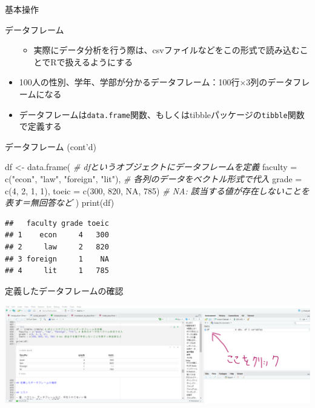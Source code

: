 \documentclass[
  ignorenonframetext,
]{beamer}
\newenvironment{Shaded}{\begin{snugshade}}{\end{snugshade}}
\newcommand{\AttributeTok}[1]{\textcolor[rgb]{0.77,0.63,0.00}{#1}}
\newcommand{\CommentTok}[1]{\textcolor[rgb]{0.56,0.35,0.01}{\textit{#1}}}
\newcommand{\ConstantTok}[1]{\textcolor[rgb]{0.00,0.00,0.00}{#1}}
\newcommand{\DecValTok}[1]{\textcolor[rgb]{0.00,0.00,0.81}{#1}}
\newcommand{\FunctionTok}[1]{\textcolor[rgb]{0.00,0.00,0.00}{#1}}
\newcommand{\NormalTok}[1]{#1}
\newcommand{\OtherTok}[1]{\textcolor[rgb]{0.56,0.35,0.01}{#1}}
\newcommand{\StringTok}[1]{\textcolor[rgb]{0.31,0.60,0.02}{#1}}
\providecommand{\tightlist}{%
  \setlength{\itemsep}{0pt}\setlength{\parskip}{0pt}}
\begin{document}
\begin{frame}[fragile]{基本操作}
\begin{block}{データフレーム}
\begin{itemize}
  \begin{itemize}
  \tightlist
  \item
    実際にデータ分析を行う際は、csvファイルなどをこの形式で読み込むことでRで扱えるようにする
  \end{itemize}
\item
  100人の性別、学年、学部が分かるデータフレーム：100行×3列のデータフレームになる
\item
  データフレームは\texttt{data.frame}関数、もしくはtibbleパッケージの\texttt{tibble}関数で定義する
\end{itemize}
\end{block}

\begin{block}{データフレーム (cont'd)}
\protect\hypertarget{ux30c7ux30fcux30bfux30d5ux30ecux30fcux30e0-contd}{}
\begin{Shaded}
\begin{Highlighting}[]
\NormalTok{df }\OtherTok{\textless{}{-}} \FunctionTok{data.frame}\NormalTok{( }\CommentTok{\# dfというオブジェクトにデータフレームを定義}
  \AttributeTok{faculty =} \FunctionTok{c}\NormalTok{(}\StringTok{"econ"}\NormalTok{, }\StringTok{"law"}\NormalTok{, }\StringTok{"foreign"}\NormalTok{, }\StringTok{"lit"}\NormalTok{), }\CommentTok{\# 各列のデータをベクトル形式で代入}
  \AttributeTok{grade =} \FunctionTok{c}\NormalTok{(}\DecValTok{4}\NormalTok{, }\DecValTok{2}\NormalTok{, }\DecValTok{1}\NormalTok{, }\DecValTok{1}\NormalTok{),}
  \AttributeTok{toeic =} \FunctionTok{c}\NormalTok{(}\DecValTok{300}\NormalTok{, }\DecValTok{820}\NormalTok{, }\ConstantTok{NA}\NormalTok{, }\DecValTok{785}\NormalTok{) }\CommentTok{\# NA: 該当する値が存在しないことを表す＝無回答など}
\NormalTok{)}
\FunctionTok{print}\NormalTok{(df)}
\end{Highlighting}
\end{Shaded}

\begin{verbatim}
##   faculty grade toeic
## 1    econ     4   300
## 2     law     2   820
## 3 foreign     1    NA
## 4     lit     1   785
\end{verbatim}
\end{block}

\begin{block}{定義したデータフレームの確認}
\protect\hypertarget{ux5b9aux7fa9ux3057ux305fux30c7ux30fcux30bfux30d5ux30ecux30fcux30e0ux306eux78baux8a8d}{}
\begin{center}\includegraphics[width=0.9\linewidth]{figs/df_check} \end{center}
\end{block}


\end{frame}
\end{document}

